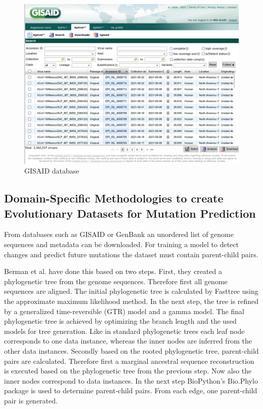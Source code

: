\begin{figure}[ht]
	\centering
	\includegraphics[width=0.9\linewidth]{figures/gisaid.png}
	\caption{\ac{GISAID} database \cite{own screenshot}}
	\label{gisaid}
\end{figure}


\subsection{Domain-Specific Methodologies to create Evo\-lu\-tio\-na\-ry Datasets for Mutation Prediction} \label{fundamentalsD}

From databases such as \ac{GISAID} or GenBank an unordered list of genome sequences and metadata can be downloaded. For training a model to detect changes and predict future mutations the dataset must contain parent-child pairs.

Berman et al. \cite{Berman2020} have done this based on two steps. First, they created a phylogenetic tree from the genome sequences. Therefore first all genome sequences are aligned. The initial phylogenetic tree is calculated by Fasttree using the approximate maximum likelihood method. In the next step, the tree is refined by a generalized time-reversible (GTR) model and a gamma model. The final phylogenetic tree is achieved by optimizing the branch length and the used models for tree generation. Like in standard phylogenetic trees each leaf node corresponds to one data instance, whereas the inner nodes are inferred from the other data instances.
Secondly based on the rooted phylogenetic tree, parent-child pairs are calculated. Therefore first a marginal ancestral sequence reconstruction is executed based on the phylogenetic tree from the previous step. Now also the inner nodes correspond to data instances. In the next step BioPython's \cite{10.1093/bioinformatics/btp163} Bio.Phylo package is used to determine parent-child pairs. From each edge, one parent-child pair is generated. \cite{Berman2020}

